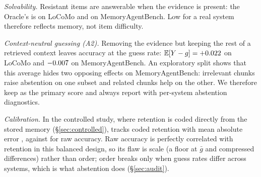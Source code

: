 \emph{Solvability.} Resistant items are answerable when the evidence is present: the Oracle's \cpr{} is
\cprOracleLocomo{} on LoCoMo and \cprOracleMab{} on MemoryAgentBench. Low \cpr{} for a real system therefore reflects
memory, not item difficulty.

\emph{Context-neutral guessing (A2).} Removing the evidence but keeping the rest of a retrieved context leaves accuracy
at the guess rate: $\mathbb{E}[Y-g]=+0.022$ on LoCoMo and $-0.007$ on MemoryAgentBench. An exploratory split shows
that this average hides two opposing effects on MemoryAgentBench: irrelevant chunks raise abstention on one subset and
related chunks help on the other. We therefore keep \cpr{} as the primary score and always report \pcs{} with per-system
abstention diagnostics.

\emph{Calibration.} In the controlled study, where retention is coded directly from the stored memory
(\S\ref{sec:controlled}), \pcs{} tracks coded retention with mean absolute error \calibMaePcs{}, against \calibMaeAcc{} for
raw accuracy. Raw accuracy is perfectly correlated with retention in this balanced design, so its flaw is scale (a floor
at $\bar g$ and compressed differences) rather than order; order breaks only when guess rates differ across systems,
which is what abstention does (\S\ref{sec:audit}).
